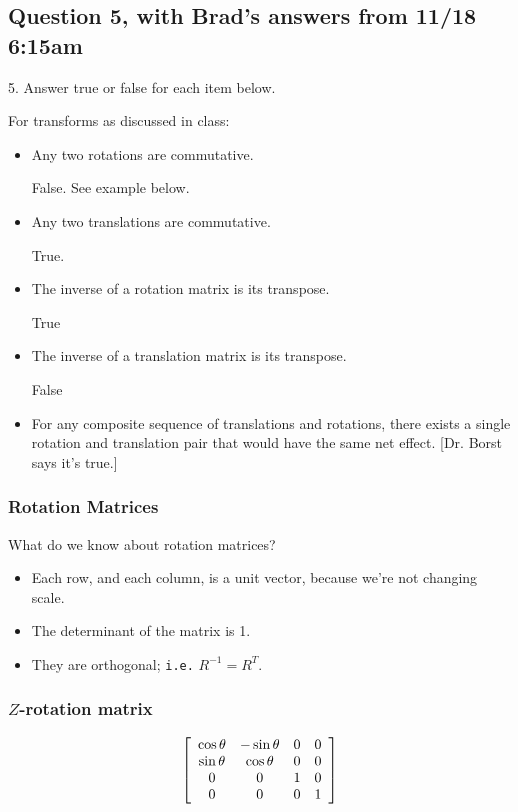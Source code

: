 \documentclass[11pt]{article}
\begin{document}
\begin{spacing}{1.2}
\subsection{Question 5, with Brad's answers from 11/18 6:15am}
5.  Answer true or false for each item below.  

For transforms as discussed in class:

\begin{itemize}
	\item Any two rotations are commutative.
	
	False.  See example below. 
	\item Any two translations are commutative.
	
	True.
	\item The inverse of a rotation matrix is its transpose.  
	
	True
	\item The inverse of a translation matrix is its transpose.  
	
	False
	\item For any composite sequence of translations and rotations, there exists a single rotation and translation pair that would have the same net effect.  [Dr. Borst says it's true.]
\end{itemize}

\subsubsection{Rotation Matrices}

What do we know about rotation matrices?

\begin{itemize}
	\item Each row, and each column, is a unit vector, because we're not changing scale.
	\item The determinant of the matrix is 1.
	\item They are orthogonal; {\tt i.e.} $R^{-1} = R^T$.
\end{itemize}

\subsubsection{$Z$-rotation matrix}

$$
\left[
\begin{array}{cccc}
	\cos \theta & - \sin \theta & 0 & 0 \cr
	\sin \theta & \cos \theta & 0 & 0 \cr
	0 & 0 & 1 & 0 \cr
	0 & 0 & 0 & 1 \cr
\end{array}
\right]
$$


\end{spacing}
\end{document}
